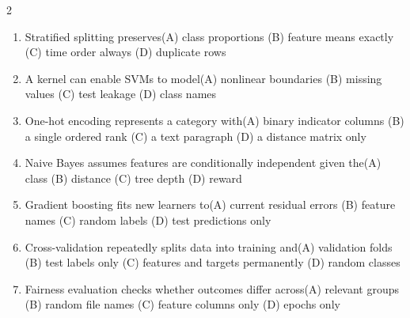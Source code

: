\documentclass[a4paper]{article}
\begin{document}
\begin{multicols*}{2}
\begin{enumerate}[resume]
\item Stratified splitting preserves\newline\hspace*{0.6em}(A) class proportions \quad (B) feature means exactly \newline\hspace*{0.6em}(C) time order always \quad (D) duplicate rows
\item A kernel can enable SVMs to model\newline\hspace*{0.6em}(A) nonlinear boundaries \quad (B) missing values \newline\hspace*{0.6em}(C) test leakage \quad (D) class names
\item One-hot encoding represents a category with\newline\hspace*{0.6em}(A) binary indicator columns \quad (B) a single ordered rank \newline\hspace*{0.6em}(C) a text paragraph \quad (D) a distance matrix only
\item Naive Bayes assumes features are conditionally independent given the\newline\hspace*{0.6em}(A) class \quad (B) distance \newline\hspace*{0.6em}(C) tree depth \quad (D) reward
\item Gradient boosting fits new learners to\newline\hspace*{0.6em}(A) current residual errors \quad (B) feature names \newline\hspace*{0.6em}(C) random labels \quad (D) test predictions only
\item Cross-validation repeatedly splits data into training and\newline\hspace*{0.6em}(A) validation folds \quad (B) test labels only \newline\hspace*{0.6em}(C) features and targets permanently \quad (D) random classes
\item Fairness evaluation checks whether outcomes differ across\newline\hspace*{0.6em}(A) relevant groups \quad (B) random file names \newline\hspace*{0.6em}(C) feature columns only \quad (D) epochs only

\end{enumerate}
\end{multicols*}
\end{document}
